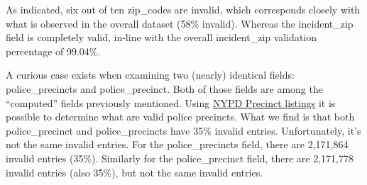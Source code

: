 \documentclass[12pt, titlepage]{article}
\begin{document}

As indicated, six out of ten zip\_codes are invalid, which corresponds closely 
with what is observed in the overall dataset (58\% invalid). Whereas 
the incident\_zip field is completely valid, in-line with the 
overall incident\_zip validation percentage of 99.04\%.


\label{sec:police-precincts}
A curious case exists when examining two (nearly) identical 
fields: police\_precincts and police\_precinct. Both of those fields 
are among the ``computed'' fields previously mentioned. Using 
\href{https://www.nyc.gov/site/nypd/bureaus/patrol/precincts-landing.page}
{NYPD Precinct listings} it is possible to determine what are valid 
police precincts. What we find is that both police\_precinct 
and police\_precincts  have  35\% invalid entries. Unfortunately, 
it's not the same invalid entries. For the police\_precincts field, 
there are 2,171,864 invalid entries (35\%). Similarly for the 
police\_precinct field, there are 2,171,778 invalid entries 
(also 35\%), but not the same invalid entries. 
\end{document}
